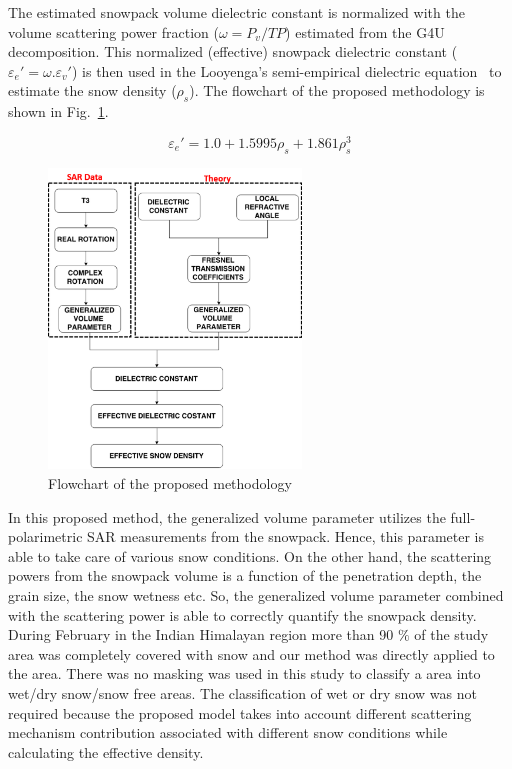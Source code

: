 The estimated snowpack volume dielectric constant is normalized with the volume scattering power fraction ($\omega=P_v/TP$) estimated from the G4U decomposition. This normalized (effective) snowpack dielectric constant ($\varepsilon_{e}{'}=\omega.\varepsilon_{v}{'}$) is then used in the Looyenga's semi-empirical dielectric equation~\citep{looyenga1965dielectric} to estimate the snow density ($\rho_s$). The flowchart of the proposed methodology is shown in Fig.~\ref{fig:methodology}. 

\begin{equation}
\varepsilon_{e}{'}=1.0 + 1.5995\rho_s + 1.861\rho_s^{3}
\label{eq:looyenga}
\end{equation}

\begin{figure}[!th]
	\centering
	\includegraphics[width=0.6\textwidth]{Figures_sd/flow_chart}
	\caption{Flowchart of the proposed methodology}
	\label{fig:methodology}
\end{figure}

In this proposed method, the generalized volume parameter utilizes the full-polarimetric SAR measurements from the snowpack. Hence, this parameter is able to take care of various snow conditions. On the other hand, the scattering powers from the snowpack volume is a function of the penetration depth, the grain size, the snow wetness etc. So, the generalized volume parameter combined with the scattering power is able to correctly quantify the snowpack density. During February in the Indian Himalayan region more than 90 $\%$ of the study area was completely covered with snow and our method was directly applied to the area. There was no masking was used in this study to classify a area into wet/dry snow/snow free areas. The classification of wet or dry snow was not required because the proposed model takes into account different scattering mechanism contribution associated with different snow conditions while calculating the effective density. 
